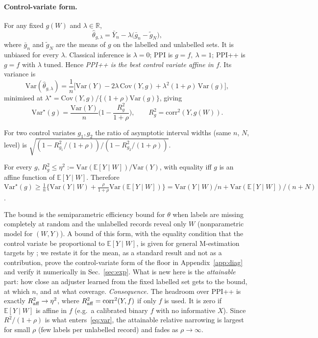 \paragraph{Control-variate form.}
For any fixed $g(W)$ and $\lambda\in\mathbb R$,
\begin{equation}
\hat\theta_{g,\lambda}=\bar Y_n-\lambda\big(\bar g_n-\tilde g_N\big),
\end{equation}
where $\bar g_n$ and $\tilde g_N$ are the means of $g$ on the labelled and unlabelled sets. It is unbiased for
every $\lambda$. Classical inference is $\lambda=0$; PPI \citep{angelopoulos2023ppi} is $g=f,\ \lambda=1$; PPI++
\citep{angelopoulos2023ppiplus} is $g=f$ with $\lambda$ tuned. Hence \emph{PPI++ is the best control variate
affine in $f$}.
Its variance is
\begin{equation}
\mathrm{Var}(\hat\theta_{g,\lambda})=\frac1n\Big[\mathrm{Var}(Y)-2\lambda\,\mathrm{Cov}(Y,g)+\lambda^2(1+\rho)\,\mathrm{Var}(g)\Big],
\end{equation}
minimised at $\lambda^\star=\mathrm{Cov}(Y,g)/\{(1+\rho)\mathrm{Var}(g)\}$, giving
\begin{equation}
\mathrm{Var}^\star(g)=\frac{\mathrm{Var}(Y)}{n}\Big(1-\frac{R_g^2}{1+\rho}\Big),\qquad R_g^2=\mathrm{corr}^2(Y,g(W)).
\label{eq:var}
\end{equation}
\begin{proposition}
For two control variates $g_1,g_2$ the ratio of asymptotic interval widths (same $n$, $N$, level) is
$\sqrt{(1-R_{g_1}^2/(1+\rho))/(1-R_{g_2}^2/(1+\rho))}$.
\end{proposition}
\begin{proposition}[Floor]
For every $g$, $R_g^2\le\eta^2:=\mathrm{Var}(\mathbb E[Y\mid W])/\mathrm{Var}(Y)$, with equality iff $g$ is an
affine function of $\mathbb E[Y\mid W]$. Therefore
$\mathrm{Var}^\star(g)\ge \frac1n\{\mathrm{Var}(Y\mid W)+\tfrac{\rho}{1+\rho}\mathrm{Var}(\mathbb E[Y\mid W])\}
=\mathrm{Var}(Y\mid W)/n+\mathrm{Var}(\mathbb E[Y\mid W])/(n+N)$.
\end{proposition}
The bound is the semiparametric efficiency bound for $\theta$ when labels are missing completely at random and
the unlabelled records reveal only $W$ (nonparametric model for $(W,Y)$). A bound of this form, with the equality
condition that the control variate be proportional to $\mathbb E[Y\mid W]$, is given for general M-estimation
targets by \citet{angelopoulos2023ppiplus}; we restate it for the mean, as a standard result and not as a contribution,
prove the control-variate form of the floor in Appendix~\ref{app:diag} and verify it numerically in Sec.~\ref{sec:exp}. What is new here is the \emph{attainable} part: how close an adjuster
learned from the fixed labelled set gets to the bound, at which $n$, and at what coverage.
\emph{Consequence.} The headroom over PPI++ is exactly $R^2_{\rm aff}\to\eta^2$, where
$R^2_{\rm aff}=\mathrm{corr}^2(Y,f)$ if only $f$ is used. It is zero if $\mathbb E[Y\mid W]$ is affine in $f$ (e.g.\ a
calibrated binary $f$ with no informative $X$). Since $R^2/(1+\rho)$ is what enters~\eqref{eq:var}, the
attainable relative narrowing is largest for small $\rho$ (few labels per unlabelled record) and fades as
$\rho\to\infty$.

